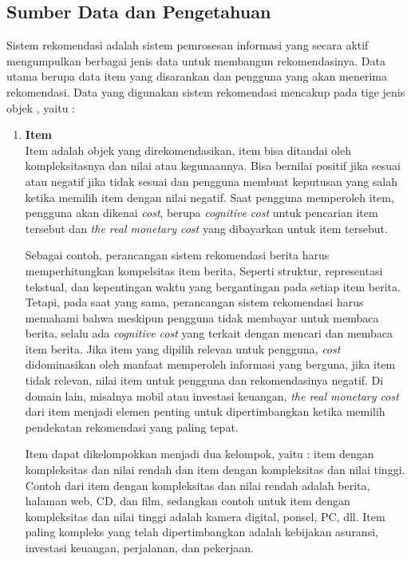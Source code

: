 \subsection{Sumber Data dan Pengetahuan}
\label{sec:sumber data dan pengetahuan}
Sistem rekomendasi adalah sistem pemrosesan informasi yang secara aktif mengumpulkan berbagai jenis data untuk membangun rekomendasinya. Data utama berupa data item yang disarankan dan pengguna yang akan menerima rekomendasi. Data yang digunakan sistem rekomendasi mencakup pada tige jenis objek \cite{buku:sistem:rekomendasi}, yaitu :
	\begin{enumerate}
	\item \textbf{Item}\\
		Item adalah objek yang direkomendasikan, item bisa ditandai oleh kompleksitasnya dan nilai atau kegunaannya. Bisa bernilai positif jika sesuai atau negatif jika tidak sesuai dan pengguna membuat keputusan yang salah ketika memilih item dengan nilai negatif. Saat pengguna memperoleh item, pengguna akan dikenai \textit{cost}, berupa \textit{cognitive cost} untuk pencarian item tersebut dan \textit{the real monetary cost} yang dibayarkan untuk item tersebut.
		
		Sebagai contoh, perancangan sistem rekomendasi berita harus memperhitungkan kompelsitas item berita, Seperti struktur, representasi tekstual, dan kepentingan waktu yang bergantingan pada setiap item berita. Tetapi, pada saat yang sama, perancangan sistem rekomendasi harus memahami bahwa meskipun pengguna tidak membayar untuk membaca berita, selalu ada \textit{cognitive cost} yang terkait dengan mencari dan membaca item berita. Jika item yang dipilih relevan untuk pengguna, \textit{cost} didominasikan oleh manfaat memperoleh informasi yang berguna, jika item tidak relevan, nilai item untuk pengguna dan rekomendasinya negatif. Di domain lain, misalnya mobil atau investasi keuangan, \textit{the real monetary cost} dari item menjadi elemen penting untuk dipertimbangkan ketika memilih pendekatan rekomendasi yang paling tepat.
		
		Item dapat dikelompokkan menjadi dua kelompok, yaitu : item dengan kompleksitas dan nilai rendah dan item dengan kompleksitas dan nilai tinggi. Contoh dari item dengan kompleksitas dan nilai rendah adalah berita, halaman web, CD, dan film, sedangkan contoh untuk item dengan kompleksitas dan nilai tinggi adalah kamera digital, ponsel, PC, dll. Item paling kompleks yang telah dipertimbangkan adalah kebijakan asuransi, investasi keuangan, perjalanan, dan pekerjaan.
		

\end{enumerate}
